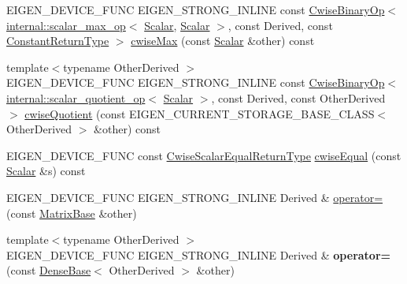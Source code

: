 \begin{DoxyCompactItemize}
\item 
E\+I\+G\+E\+N\+\_\+\+D\+E\+V\+I\+C\+E\+\_\+\+F\+U\+NC E\+I\+G\+E\+N\+\_\+\+S\+T\+R\+O\+N\+G\+\_\+\+I\+N\+L\+I\+NE const \mbox{\hyperlink{class_eigen_1_1_cwise_binary_op}{Cwise\+Binary\+Op}}$<$ \mbox{\hyperlink{struct_eigen_1_1internal_1_1scalar__max__op}{internal\+::scalar\+\_\+max\+\_\+op}}$<$ \mbox{\hyperlink{class_eigen_1_1_dense_base_a5feed465b3a8e60c47e73ecce83e39a2}{Scalar}}, \mbox{\hyperlink{class_eigen_1_1_dense_base_a5feed465b3a8e60c47e73ecce83e39a2}{Scalar}} $>$, const Derived, const \mbox{\hyperlink{class_eigen_1_1_cwise_nullary_op}{Constant\+Return\+Type}} $>$ \mbox{\hyperlink{class_eigen_1_1_matrix_base_aaf3ed6d9cad060b3e5685b3839271706}{cwise\+Max}} (const \mbox{\hyperlink{class_eigen_1_1_dense_base_a5feed465b3a8e60c47e73ecce83e39a2}{Scalar}} \&other) const
\item 
{\footnotesize template$<$typename Other\+Derived $>$ }\\E\+I\+G\+E\+N\+\_\+\+D\+E\+V\+I\+C\+E\+\_\+\+F\+U\+NC E\+I\+G\+E\+N\+\_\+\+S\+T\+R\+O\+N\+G\+\_\+\+I\+N\+L\+I\+NE const \mbox{\hyperlink{class_eigen_1_1_cwise_binary_op}{Cwise\+Binary\+Op}}$<$ \mbox{\hyperlink{struct_eigen_1_1internal_1_1scalar__quotient__op}{internal\+::scalar\+\_\+quotient\+\_\+op}}$<$ \mbox{\hyperlink{class_eigen_1_1_dense_base_a5feed465b3a8e60c47e73ecce83e39a2}{Scalar}} $>$, const Derived, const Other\+Derived $>$ \mbox{\hyperlink{class_eigen_1_1_matrix_base_ad2a4070503e44b1f9e7fc99b4cb5697b}{cwise\+Quotient}} (const E\+I\+G\+E\+N\+\_\+\+C\+U\+R\+R\+E\+N\+T\+\_\+\+S\+T\+O\+R\+A\+G\+E\+\_\+\+B\+A\+S\+E\+\_\+\+C\+L\+A\+SS$<$ Other\+Derived $>$ \&other) const
\item 
E\+I\+G\+E\+N\+\_\+\+D\+E\+V\+I\+C\+E\+\_\+\+F\+U\+NC const \mbox{\hyperlink{class_eigen_1_1_cwise_binary_op}{Cwise\+Scalar\+Equal\+Return\+Type}} \mbox{\hyperlink{class_eigen_1_1_matrix_base_a5e61bcee01dbdae901280f363610f0e3}{cwise\+Equal}} (const \mbox{\hyperlink{class_eigen_1_1_dense_base_a5feed465b3a8e60c47e73ecce83e39a2}{Scalar}} \&s) const
\item 
E\+I\+G\+E\+N\+\_\+\+D\+E\+V\+I\+C\+E\+\_\+\+F\+U\+NC E\+I\+G\+E\+N\+\_\+\+S\+T\+R\+O\+N\+G\+\_\+\+I\+N\+L\+I\+NE Derived \& \mbox{\hyperlink{class_eigen_1_1_matrix_base_a706a4dd1ee54786e9210de1a4bf02600}{operator=}} (const \mbox{\hyperlink{class_eigen_1_1_matrix_base}{Matrix\+Base}} \&other)
\item 
\mbox{\label{class_eigen_1_1_matrix_base_aa7c23e6314015d4bf5d410852d4b5f94}} 
{\footnotesize template$<$typename Other\+Derived $>$ }\\E\+I\+G\+E\+N\+\_\+\+D\+E\+V\+I\+C\+E\+\_\+\+F\+U\+NC E\+I\+G\+E\+N\+\_\+\+S\+T\+R\+O\+N\+G\+\_\+\+I\+N\+L\+I\+NE Derived \& {\bfseries operator=} (const \mbox{\hyperlink{class_eigen_1_1_dense_base}{Dense\+Base}}$<$ Other\+Derived $>$ \&other)

\end{DoxyCompactItemize}
